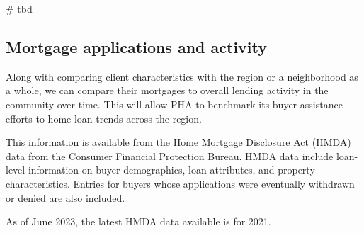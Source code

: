 \documentclass[
  letterpaper,
  DIV=11,
  numbers=noendperiod]{scrartcl}
\newenvironment{Shaded}{\begin{snugshade}}{\end{snugshade}}
\newcommand{\CommentTok}[1]{\textcolor[rgb]{0.37,0.37,0.37}{#1}}
\begin{document}
\begin{Shaded}
\begin{Highlighting}[]
\CommentTok{\# tbd}
\end{Highlighting}
\end{Shaded}

\hypertarget{mortgage-applications-and-activity}{%
\subsection{Mortgage applications and
activity}\label{mortgage-applications-and-activity}}

\begin{tcolorbox}[enhanced jigsaw, coltitle=black, titlerule=0mm, breakable, colbacktitle=quarto-callout-tip-color!10!white, opacityback=0, leftrule=.75mm, opacitybacktitle=0.6, rightrule=.15mm, title=\textcolor{quarto-callout-tip-color}{\faLightbulb}\hspace{0.5em}{Why this is needed}, arc=.35mm, colback=white, bottomtitle=1mm, toptitle=1mm, colframe=quarto-callout-tip-color-frame, bottomrule=.15mm, toprule=.15mm, left=2mm]

Along with comparing client characteristics with the region or a
neighborhood as a whole, we can compare their mortgages to overall
lending activity in the community over time. This will allow PHA to
benchmark its buyer assistance efforts to home loan trends across the
region.

\end{tcolorbox}

This information is available from the Home Mortgage Disclosure Act
(HMDA) data from the Consumer Financial Protection Bureau. HMDA data
include loan-level information on buyer demographics, loan attributes,
and property characteristics. Entries for buyers whose applications were
eventually withdrawn or denied are also included.

\begin{tcolorbox}[enhanced jigsaw, coltitle=black, titlerule=0mm, breakable, colbacktitle=quarto-callout-note-color!10!white, opacityback=0, leftrule=.75mm, opacitybacktitle=0.6, rightrule=.15mm, title=\textcolor{quarto-callout-note-color}{\faInfo}\hspace{0.5em}{Note}, arc=.35mm, colback=white, bottomtitle=1mm, toptitle=1mm, colframe=quarto-callout-note-color-frame, bottomrule=.15mm, toprule=.15mm, left=2mm]

As of June 2023, the latest HMDA data available is for 2021.

\end{tcolorbox}
\end{document}
